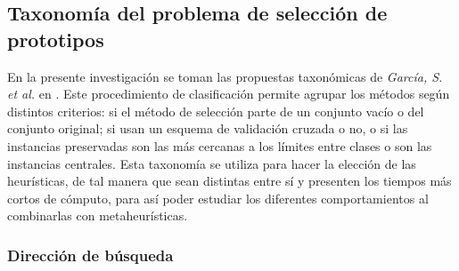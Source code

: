 
\subsection{Taxonomía del problema de selección de prototipos}

En la presente investigación se toman las propuestas taxonómicas de \emph{García, S. et al.} en \cite{garcia2012prototype}. Este procedimiento de clasificación permite agrupar los métodos según distintos criterios: si el método de selección parte de un conjunto vacío o del conjunto original; si usan un esquema de validación cruzada o no, o si las instancias preservadas son las más cercanas a los límites entre clases o son las instancias centrales. Esta taxonomía se utiliza para hacer la elección de las heurísticas, de tal manera que sean distintas entre sí y presenten los tiempos más cortos de cómputo, para así poder estudiar los diferentes comportamientos al combinarlas con metaheurísticas.


\subsubsection{Dirección de búsqueda}

